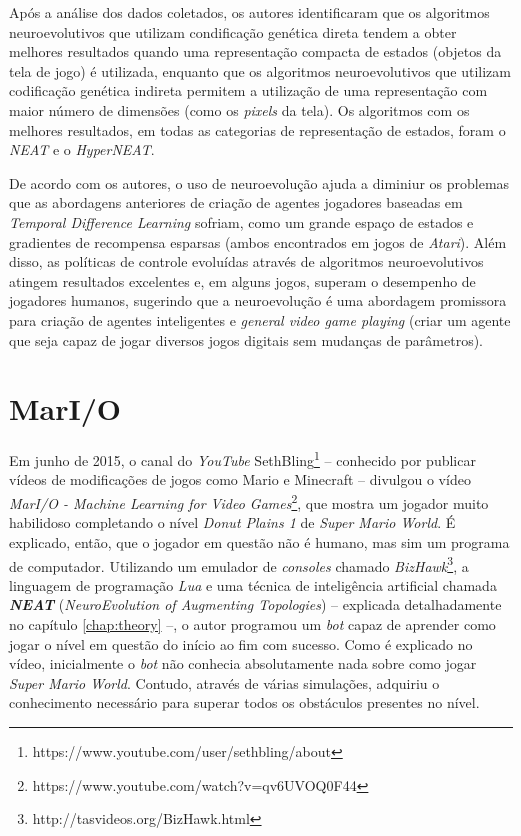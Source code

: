 Após a análise dos dados coletados, os autores identificaram que os algoritmos
neuroevolutivos que utilizam condificação genética direta tendem a obter
melhores resultados quando uma representação compacta de estados (objetos da
tela de jogo) é utilizada, enquanto que os algoritmos neuroevolutivos que
utilizam codificação genética indireta permitem a utilização de uma
representação com maior número de dimensões (como os \textit{pixels} da tela).
Os algoritmos com os melhores resultados, em todas as categorias de
representação de estados, foram o \textit{NEAT} e o \textit{HyperNEAT}.

De acordo com os autores, o uso de neuroevolução ajuda a diminiur os problemas
que as abordagens anteriores de criação de agentes jogadores baseadas em
\textit{Temporal Difference Learning} sofriam, como um grande espaço de estados
e gradientes de recompensa esparsas (ambos encontrados em jogos de
\textit{Atari}). Além disso, as políticas de controle evoluídas através de
algoritmos neuroevolutivos atingem resultados excelentes e, em alguns jogos,
superam o desempenho de jogadores humanos, sugerindo que a neuroevolução é uma
abordagem promissora para criação de agentes inteligentes e \textit{general
video game playing} (criar um agente que seja capaz de jogar diversos jogos
digitais sem mudanças de parâmetros).


\section{MarI/O}
Em junho de 2015, o canal do \textit{YouTube}
SethBling\footnote{https://www.youtube.com/user/sethbling/about} -- conhecido
por publicar vídeos de modificações de jogos como Mario e Minecraft -- divulgou
o vídeo \textit{MarI/O - Machine Learning for Video
Games}\footnote{https://www.youtube.com/watch?v=qv6UVOQ0F44}, que mostra um
jogador muito habilidoso completando o nível \textit{Donut Plains 1} de
\textit{Super Mario World}. É explicado, então, que o jogador em questão não é
humano, mas sim um programa de computador. Utilizando um emulador de
\textit{consoles} chamado
\textit{BizHawk}\footnote{http://tasvideos.org/BizHawk.html}, a linguagem de
programação \textit{Lua} e uma técnica de inteligência artificial chamada
\textit{\textbf{NEAT}} (\textit{NeuroEvolution of Augmenting Topologies})
\cite{stanley:ec02} -- explicada detalhadamente no capítulo \ref{chap:theory}
--, o autor programou um \textit{bot} capaz de aprender como jogar o nível em
questão do início ao fim com sucesso. Como é explicado no vídeo, inicialmente o
\textit{bot} não conhecia absolutamente nada sobre como jogar \textit{Super
Mario World}. Contudo, através de várias simulações, adquiriu o conhecimento
necessário para superar todos os obstáculos presentes no nível.

